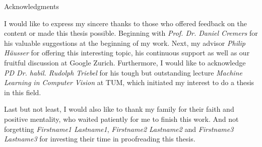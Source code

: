 \thispagestyle{empty}

\vspace*{20mm}

\begin{center}
{ Acknowledgments}
\end{center}

\vspace{10mm}

I would like to express my sincere thanks to those who offered feedback on the content or made this thesis possible. Beginning with \textit{Prof. Dr. Daniel Cremers} for his valuable suggestions at the beginning of my work. Next, my advisor \textit{Philip Häusser} for offering this interesting topic, his continuous support as well as our fruitful discussion at Google Zurich. Furthermore, I would like to acknowledge \textit{PD Dr. habil. Rudolph Triebel} for his tough but outstanding lecture \textit{Machine Learning in Computer Vision} at TUM, which initiated my interest to do a thesis in this field.


Last but not least, I would also like to thank my family for their faith and positive mentality, who waited patiently for me to finish this work. And not forgetting \textit{Firstname1 Lastname1}, \textit{Firstname2 Lastname2} and \textit{Firstname3 Lastname3} for investing their time in proofreading this thesis.

\cleardoublepage{}
